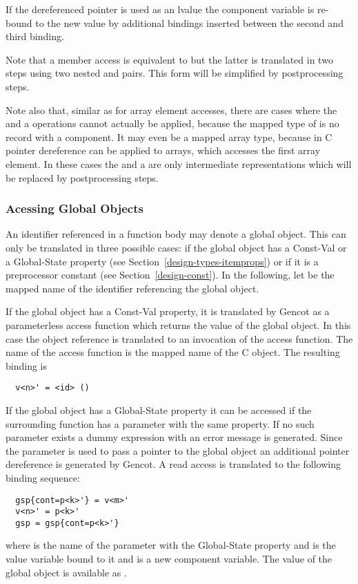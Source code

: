If the dereferenced pointer is used as an lvalue the component variable  is re-bound to the new value by additional
bindings inserted between the second and third binding.

Note that a member access  is equivalent to  but the latter is translated in two steps using two
nested  and  pairs. This form will be simplified by postprocessing steps.

Note also that, similar as for array element accesses, there are cases where the  and a  operations cannot
actually be applied, because the mapped type of  is no record with a  component. It may even be a mapped
array type, because in C pointer dereference can be applied to arrays, which accesses the first array element. In these cases
the  and a  are only intermediate representations which will be replaced by postprocessing steps.

\subsubsection{Acessing Global Objects}

An identifier referenced in a function body may denote a global object. This can only be translated in three possible cases: if
the global object has a Const-Val or a Global-State property (see Section~\ref{design-types-itemprops}) or if it is a
preprocessor constant (see Section~\ref{design-const}). In the following, let  be the mapped name of the identifier
referencing the global object.

If the global object has a Const-Val property, it is translated by Gencot as a parameterless access function which returns
the value of the global object. In this case the object reference is translated to an invocation of the access function. The
name of the access function is the mapped name of the C object. The resulting binding is
\begin{verbatim}
  v<n>' = <id> ()
\end{verbatim}

If the global object has a Global-State property it can be accessed if the surrounding function has a parameter with the same
property. If no such parameter exists a dummy expression with an error message is generated. Since the parameter is used to
pass a pointer to the global object an additional pointer dereference is generated by Gencot.
A read access is translated to the following binding sequence:
\begin{verbatim}
  gsp{cont=p<k>'} = v<m>'
  v<n>' = p<k>'
  gsp = gsp{cont=p<k>'}
\end{verbatim}
where  is the name of the parameter with the Global-State property and  is the value variable bound
to it and  is a new component variable. The value of the global object is available as .

